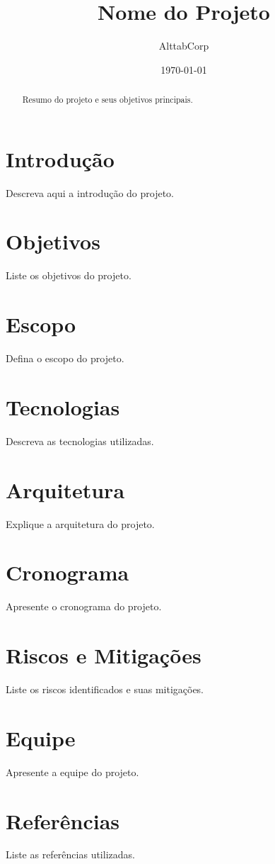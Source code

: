\documentclass[12pt,a4paper]{article}
\title{Nome do Projeto}
\author{AlttabCorp}
\date{\today}
\begin{document}
\maketitle

\begin{abstract}
Resumo do projeto e seus objetivos principais.
\end{abstract}

\tableofcontents

\section{Introdução}
Descreva aqui a introdução do projeto.

\section{Objetivos}
Liste os objetivos do projeto.

\section{Escopo}
Defina o escopo do projeto.

\section{Tecnologias}
Descreva as tecnologias utilizadas.

\section{Arquitetura}
Explique a arquitetura do projeto.

\section{Cronograma}
Apresente o cronograma do projeto.

\section{Riscos e Mitigações}
Liste os riscos identificados e suas mitigações.

\section{Equipe}
Apresente a equipe do projeto.

\section{Referências}
Liste as referências utilizadas.
\end{document}
